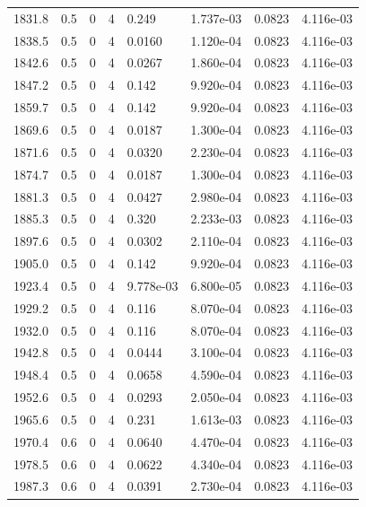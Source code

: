 \documentclass[preview]{standalone}
\begin{document}
{{{{{{{{{\begin{tabular}{L{1.2cm}C{1.2cm} C{0.3cm}C{0.5cm} C{1.4cm}C{1.4cm} C{1.4cm}C{1.4cm}}
  1831.8  &   0.5  & 0     &  4 &  0.249  & 1.737e-03  & 0.0823 &  4.116e-03   \\ 
  1838.5  &   0.5  & 0     &  4 &  0.0160  & 1.120e-04  & 0.0823 &  4.116e-03   \\ 
  1842.6  &   0.5  & 0     &  4 &  0.0267  & 1.860e-04  & 0.0823 &  4.116e-03   \\ 
  1847.2  &   0.5  & 0     &  4 &  0.142  & 9.920e-04  & 0.0823 &  4.116e-03   \\ 
  1859.7  &   0.5  & 0     &  4 &  0.142  & 9.920e-04  & 0.0823 &  4.116e-03   \\ 
  1869.6  &   0.5  & 0     &  4 &  0.0187  & 1.300e-04  & 0.0823 &  4.116e-03   \\ 
  1871.6  &   0.5  & 0     &  4 &  0.0320  & 2.230e-04  & 0.0823 &  4.116e-03   \\ 
  1874.7  &   0.5  & 0     &  4 &  0.0187  & 1.300e-04  & 0.0823 &  4.116e-03   \\ 
  1881.3  &   0.5  & 0     &  4 &  0.0427  & 2.980e-04  & 0.0823 &  4.116e-03   \\ 
  1885.3  &   0.5  & 0     &  4 &  0.320  & 2.233e-03  & 0.0823 &  4.116e-03   \\ 
  1897.6  &   0.5  & 0     &  4 &  0.0302  & 2.110e-04  & 0.0823 &  4.116e-03   \\ 
  1905.0  &   0.5  & 0     &  4 &  0.142  & 9.920e-04  & 0.0823 &  4.116e-03   \\ 
  1923.4  &   0.5  & 0     &  4 &  9.778e-03  & 6.800e-05  & 0.0823 &  4.116e-03   \\ 
  1929.2  &   0.5  & 0     &  4 &  0.116  & 8.070e-04  & 0.0823 &  4.116e-03   \\ 
  1932.0  &   0.5  & 0     &  4 &  0.116  & 8.070e-04  & 0.0823 &  4.116e-03   \\ 
  1942.8  &   0.5  & 0     &  4 &  0.0444  & 3.100e-04  & 0.0823 &  4.116e-03   \\ 
  1948.4  &   0.5  & 0     &  4 &  0.0658  & 4.590e-04  & 0.0823 &  4.116e-03   \\ 
  1952.6  &   0.5  & 0     &  4 &  0.0293  & 2.050e-04  & 0.0823 &  4.116e-03   \\ 
  1965.6  &   0.5  & 0     &  4 &  0.231  & 1.613e-03  & 0.0823 &  4.116e-03   \\ 
  1970.4  &   0.6  & 0     &  4 &  0.0640  & 4.470e-04  & 0.0823 &  4.116e-03   \\ 
  1978.5  &   0.6  & 0     &  4 &  0.0622  & 4.340e-04  & 0.0823 &  4.116e-03   \\ 
  1987.3  &   0.6  & 0     &  4 &  0.0391  & 2.730e-04  & 0.0823 &  4.116e-03   \\ 

\end{tabular}}}}}}}}}}
\end{document}
